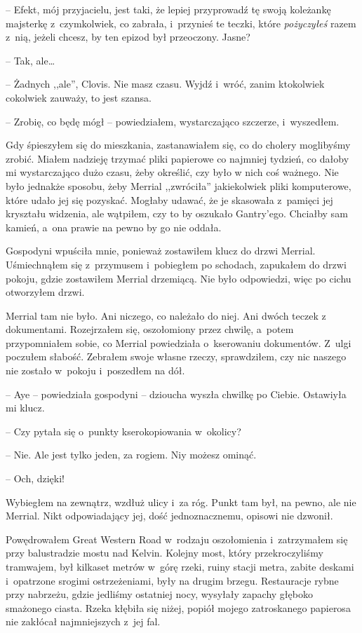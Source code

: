 \documentclass[oneside,polish,11pt,sfheadings]{mwbk}
\begin{document}
-- Efekt, mój przyjacielu, jest taki, że
lepiej przyprowadź tę swoją koleżankę majsterkę z~czymkolwiek, co
zabrała, i~przynieś te teczki, które \textit{pożyczyłeś} razem z~nią,
jeżeli chcesz, by ten epizod był przeoczony. Jasne?

-- Tak, ale\ldots

-- Żadnych ,,ale'', Clovis. Nie masz czasu. Wyjdź i~wróć, zanim
ktokolwiek cokolwiek zauważy, to jest szansa.

-- Zrobię, co będę mógł -- powiedziałem, wystarczająco szczerze, i~wyszedłem.

Gdy śpieszyłem się do mieszkania, zastanawiałem się, co do cholery
moglibyśmy zrobić. Miałem nadzieję trzymać pliki papierowe co najmniej
tydzień, co dałoby mi wystarczająco dużo czasu, żeby określić, czy było
w nich coś ważnego. Nie było jednakże sposobu, żeby Merrial ,,zwróciła''
jakiekolwiek pliki komputerowe, które udało jej się pozyskać. Mogłaby
udawać, że je skasowała z~pamięci jej kryształu widzenia, ale wątpiłem,
czy to by oszukało Gantry'ego. Chciałby sam kamień, a~ona prawie na
pewno by go nie oddała.

Gospodyni wpuściła mnie, ponieważ zostawiłem klucz do drzwi Merrial.
Uśmiechnąłem się z~przymusem i~pobiegłem po schodach, zapukałem do drzwi
pokoju, gdzie zostawiłem Merrial drzemiącą. Nie było odpowiedzi, więc po
cichu otworzyłem drzwi.

Merrial tam nie było. Ani niczego, co należało do niej. Ani dwóch teczek
z dokumentami. Rozejrzałem się, oszołomiony przez chwilę, a~potem
przypomniałem sobie, co Merrial powiedziała o~kserowaniu dokumentów. Z~ulgi poczułem słabość. Zebrałem swoje własne rzeczy, sprawdziłem, czy
nic naszego nie zostało w~pokoju i~poszedłem na dół.

-- Aye -- powiedziała gospodyni -- dzioucha wyszła chwilkę po Ciebie.
Ostawiyła mi klucz.

-- Czy pytała się o~punkty kserokopiowania w~okolicy?

-- Nie. Ale jest tylko jeden, za rogiem. Niy możesz ominąć.

-- Och, dzięki!

Wybiegłem na zewnątrz, wzdłuż ulicy i~za róg. Punkt tam był, na pewno,
ale nie Merrial. Nikt odpowiadający jej, dość jednoznacznemu, opisowi
nie dzwonił.

Powędrowałem Great Western Road w~rodzaju oszołomienia i~zatrzymałem się
przy balustradzie mostu nad Kelvin. Kolejny most, który przekroczyliśmy
tramwajem, był kilkaset metrów w~górę rzeki, ruiny stacji metra, zabite
deskami i~opatrzone srogimi ostrzeżeniami, były na drugim brzegu.
Restauracje rybne przy nabrzeżu, gdzie jedliśmy ostatniej nocy, wysyłały
zapachy głęboko smażonego ciasta. Rzeka kłębiła się niżej, popiół mojego
zatroskanego papierosa nie zakłócał najmniejszych z~jej fal.
\end{document}
